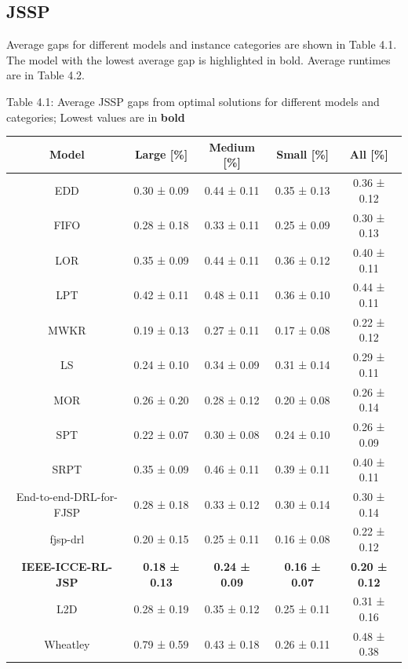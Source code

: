 \subsection{JSSP} \label{results_jssp}
Average gaps for different models and instance categories are shown in Table 4.1. The model with the lowest average gap is highlighted in bold. Average runtimes are in Table 4.2. 

\begin{table}
    Table 4.1: Average JSSP gaps from optimal solutions for different models and categories; Lowest values are in \textbf{bold}\\
    \vspace{1mm}
    \small 
    \begin{tabular}{ccccc}
        \toprule
        Model & Large [\%] & Medium [\%] & Small [\%] & All [\%] \\ 
        \midrule
        EDD & 0.30 ± 0.09 & 0.44 ± 0.11 & 0.35 ± 0.13 & 0.36 ± 0.12 \\
        FIFO & 0.28 ± 0.18 & 0.33 ± 0.11 & 0.25 ± 0.09 & 0.30 ± 0.13  \\
        LOR & 0.35 ± 0.09 & 0.44 ± 0.11 & 0.36 ± 0.12 & 0.40 ± 0.11\\
        LPT & 0.42 ± 0.11 & 0.48 ± 0.11 & 0.36 ± 0.10 & 0.44 ± 0.11\\
        MWKR & 0.19 ± 0.13 & 0.27 ± 0.11 & 0.17 ± 0.08 & 0.22 ± 0.12 \\
        LS & 0.24 ± 0.10 & 0.34 ± 0.09 & 0.31 ± 0.14 & 0.29 ± 0.11 \\
        MOR & 0.26 ± 0.20 & 0.28 ± 0.12 & 0.20 ± 0.08 & 0.26 ± 0.14 \\
        SPT & 0.22 ± 0.07 & 0.30 ± 0.08 & 0.24 ± 0.10 & 0.26 ± 0.09 \\
        SRPT & 0.35 ± 0.09 & 0.46 ± 0.11 & 0.39 ± 0.11 & 0.40 ± 0.11 \\
        End-to-end-DRL-for-FJSP & 0.28 ± 0.18 & 0.33 ± 0.12 & 0.30 ± 0.14 & 0.30 ± 0.14  \\
        fjsp-drl & 0.20 ± 0.15 & 0.25 ± 0.11 & 0.16 ± 0.08 & 0.22 ± 0.12 \\
        \textbf{IEEE-ICCE-RL-JSP} & \textbf{0.18 ± 0.13} & \textbf{0.24 ± 0.09} & \textbf{0.16 ± 0.07} & \textbf{0.20 ± 0.12} \\
        L2D & 0.28 ± 0.19 & 0.35 ± 0.12 & 0.25 ± 0.11 & 0.31 ± 0.16 \\
        Wheatley & 0.79 ± 0.59 & 0.43 ± 0.18 & 0.26 ± 0.11 & 0.48 ± 0.38 \\
        \bottomrule
    \end{tabular}
\end{table}


